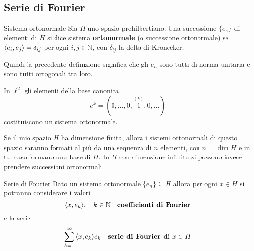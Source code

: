 \subsection{Serie di Fourier}
\begin{definition}{Sistema ortonormale}
    Sia \(H\) uno spazio prehilbertiano. Una successione \(\{e_{n}\} \) di
    elementi di \(H\) si dice sistema \textbf{ortonormale} (o successione
    ortonormale) se \({\left\langle e_{i}, e_{j}\right\rangle} = \delta_{ij}\) per ogni \(i, j \in
    \mathbb{N}\), con \(\delta_{ij}\) la delta di Kronecker.
\end{definition}
Quindi la precedente definizione significa che gli \(e_{n}\) sono tutti di norma
unitaria e sono tutti ortogonali tra loro.
\begin{example}
    In \(\ell^2\) gli elementi della base canonica 
    \[
        e^{k} = (0, \ldots, 0, \overset{(k)}{1}, 0, \ldots)
    \]
    costituiscono un sistema ortonormale.
\end{example}
\begin{remark}
    Se il mio spazio \(H\) ha dimensione finita, allora i sistemi ortonormali di
    questo spazio saranno formati al più da una sequenza di \(n\) elementi, con
    \(n = \dim H\) e in tal caso formano una base di \(H\). In \(H\) con
    dimensione infinita si possono invece prendere successioni ortonormali.
\end{remark}
\begin{definition}{Serie di Fourier}\label{def:fourier}
    Dato un sistema ortonormale \(\{e_{n}\} \subseteq H \) allora per ogni \(x
    \in H\) si potranno considerare i valori \[{\left\langle x, e_{k}\right\rangle}, \quad k \in
    \mathbb{N}\quad \text{\textbf{coefficienti di Fourier}}\] e la serie
    \[
      \sum_{k=1}^{\infty} {\left\langle x, e_{k}\right\rangle} e_{k} \quad \text{\textbf{serie di
      Fourier di }} x \in H
    \]
\end{definition}

